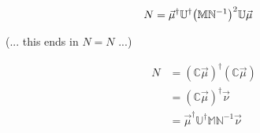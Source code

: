 \documentclass[
	english,
	a4paper,
	fontsize=10pt,
	parskip=half,
	titlepage=true,
	DIV=12,
	final
]{scrreprt}
\newcommand*{\setComplex}  {\ensuremath{\mathds{C}}}
\begin{document}
\begin{align}
	N
&=
	\vec{\mu}^\dagger
	\mathbb{U}^\dagger 
	\qty(\mathbb{M} \mathbb{N}^{-1})^{2}
	\mathbb{U} 
	\vec{\mu}	
\end{align}

(... this ends in $N=N$ ...)

\begin{align}
	N
&=
	(\mathbb{C} \vec{\mu})^\dagger (\mathbb{C} \vec{\mu}) \\
&=
	(\mathbb{C} \vec{\mu})^\dagger  \vec{\nu} \\
&=
	\vec{\mu}^\dagger \mathbb{U}^\dagger \mathbb{M} \mathbb{N}^{-1} \vec{\nu}
\end{align}

\end{document}
